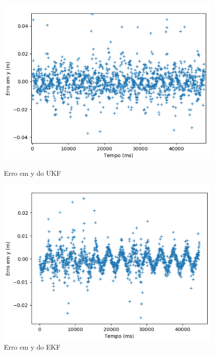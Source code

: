 \documentclass[
	12pt,				%
	openright,			%
	twoside,			%
	convert,
	a4paper,			%
	english,			%
	french,				%
	spanish,			%
	brazil				%
	]{abntex2}
\begin{document}
\begin{figure}[H]
  \centering
  \begin{minipage}[b]{0.45\textwidth}
    \includegraphics[width=\textwidth]{ukf_y}
    \caption{Erro em y do UKF}
  \end{minipage}
  \begin{minipage}[b]{0.45\textwidth}
    \includegraphics[width=\textwidth]{ekf_y}
    \caption{Erro em y do EKF}
  \end{minipage}
\end{figure}
\end{document}
